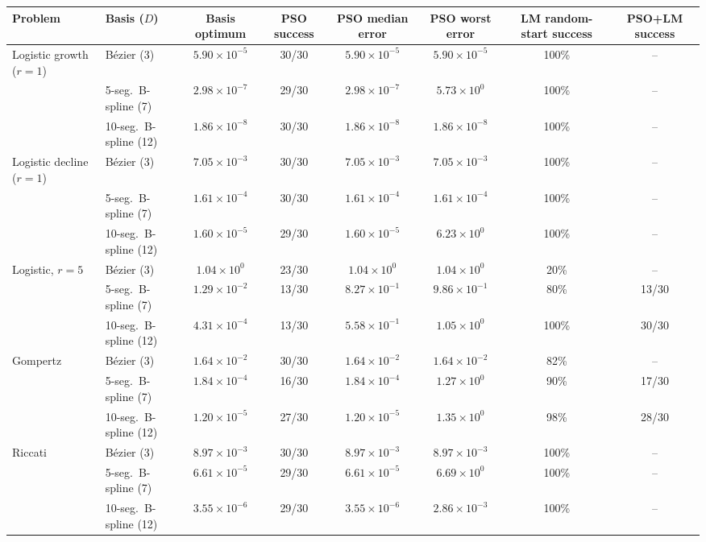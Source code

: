 \begin{tabular}{llcccccc}
\toprule
Problem & Basis ($D$) & Basis optimum & PSO success & PSO median error & PSO worst error & LM random-start success & PSO+LM success\\
\midrule
Logistic growth ($r=1$) & B\'ezier (3) & $5.90\times10^{-5}$ & 30/30 & $5.90\times10^{-5}$ & $5.90\times10^{-5}$ & 100\% & --\\
 & 5-seg.\ B-spline (7) & $2.98\times10^{-7}$ & 29/30 & $2.98\times10^{-7}$ & $5.73\times10^{0}$ & 100\% & --\\
 & 10-seg.\ B-spline (12) & $1.86\times10^{-8}$ & 30/30 & $1.86\times10^{-8}$ & $1.86\times10^{-8}$ & 100\% & --\\
\addlinespace
Logistic decline ($r=1$) & B\'ezier (3) & $7.05\times10^{-3}$ & 30/30 & $7.05\times10^{-3}$ & $7.05\times10^{-3}$ & 100\% & --\\
 & 5-seg.\ B-spline (7) & $1.61\times10^{-4}$ & 30/30 & $1.61\times10^{-4}$ & $1.61\times10^{-4}$ & 100\% & --\\
 & 10-seg.\ B-spline (12) & $1.60\times10^{-5}$ & 29/30 & $1.60\times10^{-5}$ & $6.23\times10^{0}$ & 100\% & --\\
\addlinespace
Logistic, $r=5$ & B\'ezier (3) & $1.04\times10^{0}$ & 23/30 & $1.04\times10^{0}$ & $1.04\times10^{0}$ & 20\% & --\\
 & 5-seg.\ B-spline (7) & $1.29\times10^{-2}$ & 13/30 & $8.27\times10^{-1}$ & $9.86\times10^{-1}$ & 80\% & 13/30\\
 & 10-seg.\ B-spline (12) & $4.31\times10^{-4}$ & 13/30 & $5.58\times10^{-1}$ & $1.05\times10^{0}$ & 100\% & 30/30\\
\addlinespace
Gompertz & B\'ezier (3) & $1.64\times10^{-2}$ & 30/30 & $1.64\times10^{-2}$ & $1.64\times10^{-2}$ & 82\% & --\\
 & 5-seg.\ B-spline (7) & $1.84\times10^{-4}$ & 16/30 & $1.84\times10^{-4}$ & $1.27\times10^{0}$ & 90\% & 17/30\\
 & 10-seg.\ B-spline (12) & $1.20\times10^{-5}$ & 27/30 & $1.20\times10^{-5}$ & $1.35\times10^{0}$ & 98\% & 28/30\\
\addlinespace
Riccati & B\'ezier (3) & $8.97\times10^{-3}$ & 30/30 & $8.97\times10^{-3}$ & $8.97\times10^{-3}$ & 100\% & --\\
 & 5-seg.\ B-spline (7) & $6.61\times10^{-5}$ & 29/30 & $6.61\times10^{-5}$ & $6.69\times10^{0}$ & 100\% & --\\
 & 10-seg.\ B-spline (12) & $3.55\times10^{-6}$ & 29/30 & $3.55\times10^{-6}$ & $2.86\times10^{-3}$ & 100\% & --\\
\bottomrule
\end{tabular}